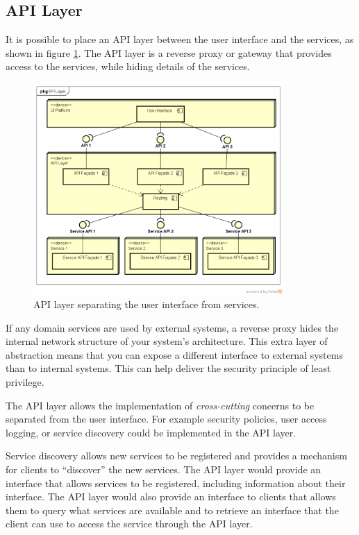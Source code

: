 \subsection{API Layer}

It is possible to place an API layer between the user interface and the services,
as shown in figure \ref{fig:api-layer}.
The API layer is a reverse proxy or gateway that provides access to the services,
while hiding details of the services.

\begin{figure}[h!]
    \centering
    \includegraphics[trim=39 37 21 42,clip,width=0.85\textwidth]{diagrams/api-layer.png}
    \caption{API layer separating the user interface from services.}
    \label{fig:api-layer}
\end{figure}

If any domain services are used by external systems, a reverse proxy hides the internal network structure of your system's architecture.
This extra layer of abstraction means that you can expose a different interface to external systems than to internal systems.
This can help deliver the security principle of least privilege.

The API layer allows the implementation of \emph{cross-cutting} concerns to be separated from the user interface.
For example security policies, user access logging, or service discovery could be implemented in the API layer.

Service discovery allows new services to be registered and provides a mechanism for clients to ``discover'' the new services.
The API layer would provide an interface that allows services to be registered, including information about their interface.
The API layer would also provide an interface to clients that allows them to query what services are available
and to retrieve an interface that the client can use to access the service through the API layer.

